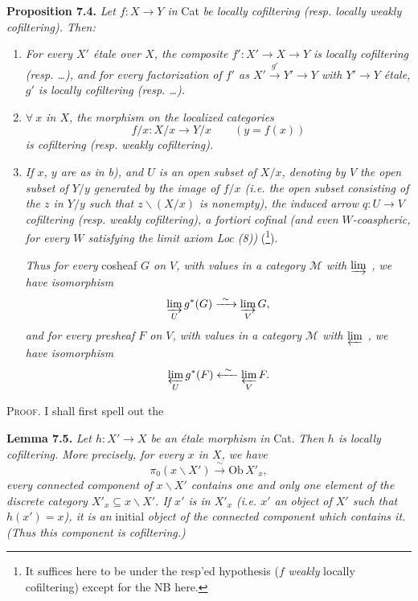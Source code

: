 \textbf{Proposition 7.4.} \textit{Let $f : X \longrightarrow Y$ in} Cat \textit{be locally cofiltering (resp. locally weakly cofiltering). Then:}
\begin{enumerate}
\item[\textit{a)}] \textit{For every $X'$ étale over $X$, the composite $f' : X' \longrightarrow X \longrightarrow Y$ is locally cofiltering (resp. \dots), and for every factorization of $f'$ as $X' \xrightarrow{g'} Y' \longrightarrow Y$ with $Y' \longrightarrow Y$ étale, $g'$ is locally cofiltering (resp. \dots).}
\item[\textit{b)}] \textit{$\forall\ x$ in $X$, the morphism on the localized categories}
\[
f/x : X/x \longrightarrow Y/x \qquad (y = f(x)) %
\]
\textit{is cofiltering (resp. weakly cofiltering).}
\item[\textit{c)}] \textit{If $x$, $y$ are as in b), and $U$ is an open subset of $X/x$, denoting by $V$ the open subset of $Y/y$ generated by the image of $f/x$ (i.e. the open subset consisting of the $z$ in $Y/y$ such that $z\backslash(X/x)$ is nonempty), the induced arrow $q : U \longrightarrow V$} \textit{cofiltering (resp. weakly cofiltering), a fortiori cofinal (and even $W$-coaspheric, for every $W$ satisfying the limit axiom Loc (8))} (\footnote[65]{It suffices here to be under the resp'ed hypothesis ($f$ \textit{weakly} locally cofiltering) except for the NB here. %
}). %

\textit{Thus for every} cosheaf \textit{$G$ on $V$, with values in a category $\mathcal{M}$ with $\varinjlim$ , we have} \textit{isomorphism} %
\[
\varinjlim_U g^*(G) \xrightarrow{\ \sim\ } \varinjlim_V G,
\]
\textit{and for every presheaf $F$ on $V$, with values in a category $\mathcal{M}$ with $\varprojlim$ , we have} \textit{isomorphism}
\[
\varprojlim_U g^*(F) \xleftarrow{\ \sim\ } \varprojlim_V F.
\]
\end{enumerate}

\textsc{Proof}. I shall first spell out the

\textbf{Lemma 7.5.} \textit{Let $h : X' \longrightarrow X$ be an étale morphism in} Cat. \textit{Then $h$ is locally cofiltering. More precisely, for every $x$ in $X$, we have}
\[
\pi_0(x\backslash X') \xrightarrow{\ \sim\ } \mathrm{Ob}\,X'_x,
\]
\textit{every connected component of $x\backslash X'$ contains one and only one element of the discrete category $X'_x \subseteq x\backslash X'$. If $x'$ is in $X'_x$ (i.e. $x'$ an object of $X'$ such that $h(x') = x$), it is an} initial \textit{object of the connected component which contains it. (Thus this component is cofiltering.)}

